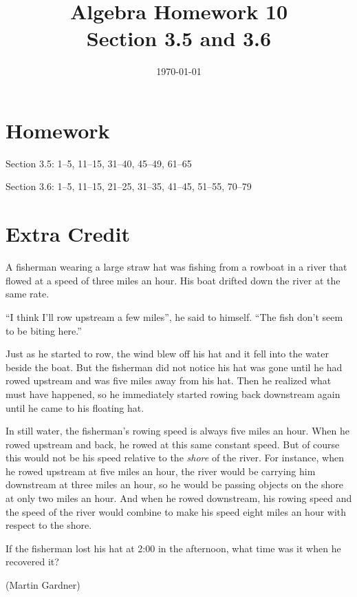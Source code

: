 \documentclass[letterpaper, landscape]{exam}
\title{Algebra Homework 10 \\ Section 3.5 and 3.6}
\author{}
\date{\today}
\begin{document}
  \maketitle

  \section{Homework}

  \begin{itemize*}
    \item Section 3.5: 1--5, 11--15, 31--40, 45--49, 61--65
    \item Section 3.6: 1--5, 11--15, 21--25, 31--35, 41--45, 51--55, 70--79
  \end{itemize*}

  \section{Extra Credit}

  A fisherman wearing a large straw hat was fishing from a rowboat in a river
  that flowed at a speed of three miles an hour.  His boat drifted down the
  river at the same rate.

  ``I think I'll row upstream a few miles'', he said to himself.  ``The fish
  don't seem to be biting here.''

  Just as he started to row, the wind blew off his hat and it fell into the
  water beside the boat.  But the fisherman did not notice his hat was gone
  until he had rowed upstream and was five miles away from his hat.  Then he
  realized what must have happened, so he immediately started rowing back
  downstream again until he came to his floating hat.

  In still water, the fisherman's rowing speed is always five miles an hour.
  When he rowed upstream and back, he rowed at this same constant speed.  But
  of course this would not be his speed relative to the {\em shore\/} of the
  river.  For instance, when he rowed upstream at five miles an hour, the river
  would be carrying him downstream at three miles an hour, so he would be
  passing objects on the shore at only two miles an hour.  And when he rowed
  downstream, his rowing speed and the speed of the river would combine to make
  his speed eight miles an hour with respect to the shore.

  If the fisherman lost his hat at 2:00 in the afternoon, what time was it when
  he recovered it?

  (Martin Gardner)
\end{document}
